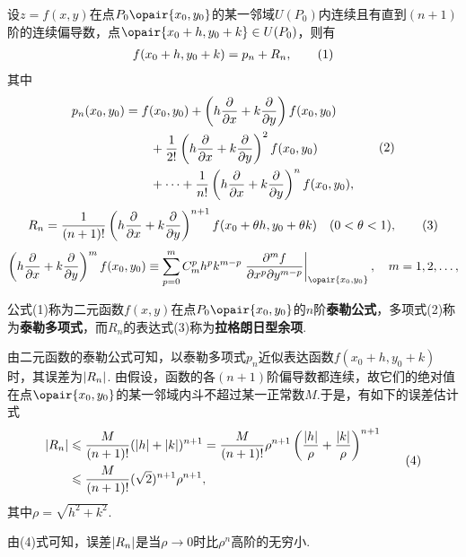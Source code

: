 \begin{theorem}\label{theorem:多元函数微分法.二元函数的泰勒公式}
\def\oprt#1{\left(h\pdv{x}+k\pdv{y}\right)\ifx\relax#1\relax\else^{#1}\fi}
设\(z=f(x,y)\)在点\(P_0\opair{x_0,y_0}\)的某一邻域\(U(P_0)\)内连续且有直到\((n+1)\)阶的连续偏导数，点\(\opair{x_0+h,y_0+k} \in U(P_0)\)，则有
\begin{gather}
f(x_0+h,y_0+k) = p_n + R_n,
\tag1
\end{gather}
其中\begin{gather}
\label{equation:多元函数微分法.二元函数的泰勒多项式}
\begin{split}
p_n(x_0,y_0)
&=f(x_0,y_0)
 + \oprt{} f(x_0,y_0) \\
&\hspace{20pt}+ \frac{1}{2!} \oprt{2} f(x_0,y_0) \\
&\hspace{20pt}+ \dotsb + \frac{1}{n!} \oprt{n} f(x_0,y_0),
\end{split}
\tag2
\end{gather}
\begin{gather}
\label{equation:多元函数微分法.二元函数的泰勒公式的拉格朗日型余项}
R_n = \frac{1}{(n+1)!} \oprt{n+1} f(x_0+\theta h,y_0+\theta k)
\quad (0 < \theta < 1),
\tag3
\end{gather}\[
\oprt{m} f(x_0,y_0)
\equiv
\sum\limits_{p=0}^{m} C_m^p h^p k^{m-p}
 \eval{\frac{\partial^m f}{\partial x^p \partial y^{m-p}}}_{\opair{x_0,y_0}},
\quad m=1,2,\dotsc,
\]

公式(1)称为二元函数\(f(x,y)\)在点\(P_0\opair{x_0,y_0}\)的\(n\)阶\textbf{泰勒公式}，多项式(2)称为\textbf{泰勒多项式}，而\(R_n\)的表达式(3)称为\textbf{拉格朗日型余项}.
\end{theorem}
由二元函数的泰勒公式可知，以泰勒多项式\(p_n\)近似表达函数\(f(x_0+h,y_0+k)\)时，其误差为\(\abs{R_n}\).
由假设，函数的各\((n+1)\)阶偏导数都连续，故它们的绝对值在点\(\opair{x_0,y_0}\)的某一邻域内斗不超过某一正常数\(M\).于是，有如下的误差估计式\begin{gather}
\begin{split}
\abs{R_n}
&\leqslant \frac{M}{(n+1)!} (\abs{h}+\abs{k})^{n+1}
= \frac{M}{(n+1)!} \rho^{n+1} \left( \frac{\abs{h}}{\rho} + \frac{\abs{k}}{\rho} \right)^{n+1} \\
&\leqslant \frac{M}{(n+1)!} (\sqrt{2})^{n+1} \rho^{n+1},
\end{split}
\tag4
\end{gather}其中\(\rho=\sqrt{h^2+k^2}\).

由(4)式可知，误差\(\abs{R_n}\)是当\(\rho\to0\)时比\(\rho^n\)高阶的无穷小.

